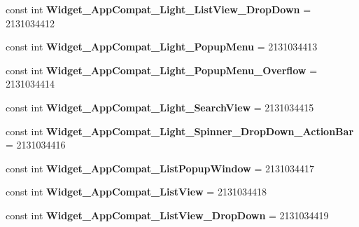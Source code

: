 \begin{DoxyCompactItemize}
\item 
\hypertarget{classClient_1_1Droid_1_1Resource_1_1Style_aad66653d42e13d2c43a6bc4760e02364}{}const int {\bfseries Widget\+\_\+\+App\+Compat\+\_\+\+Light\+\_\+\+List\+View\+\_\+\+Drop\+Down} = 2131034412\label{classClient_1_1Droid_1_1Resource_1_1Style_aad66653d42e13d2c43a6bc4760e02364}

\item 
\hypertarget{classClient_1_1Droid_1_1Resource_1_1Style_a28ac5fc9ff87ff1571a82f9e761ebbe6}{}const int {\bfseries Widget\+\_\+\+App\+Compat\+\_\+\+Light\+\_\+\+Popup\+Menu} = 2131034413\label{classClient_1_1Droid_1_1Resource_1_1Style_a28ac5fc9ff87ff1571a82f9e761ebbe6}

\item 
\hypertarget{classClient_1_1Droid_1_1Resource_1_1Style_aba5df96d4c744819b94126b9633366e2}{}const int {\bfseries Widget\+\_\+\+App\+Compat\+\_\+\+Light\+\_\+\+Popup\+Menu\+\_\+\+Overflow} = 2131034414\label{classClient_1_1Droid_1_1Resource_1_1Style_aba5df96d4c744819b94126b9633366e2}

\item 
\hypertarget{classClient_1_1Droid_1_1Resource_1_1Style_a699826296d25799257a6ba55d907957a}{}const int {\bfseries Widget\+\_\+\+App\+Compat\+\_\+\+Light\+\_\+\+Search\+View} = 2131034415\label{classClient_1_1Droid_1_1Resource_1_1Style_a699826296d25799257a6ba55d907957a}

\item 
\hypertarget{classClient_1_1Droid_1_1Resource_1_1Style_adff01f504a183925dcdf3d3f79bfe547}{}const int {\bfseries Widget\+\_\+\+App\+Compat\+\_\+\+Light\+\_\+\+Spinner\+\_\+\+Drop\+Down\+\_\+\+Action\+Bar} = 2131034416\label{classClient_1_1Droid_1_1Resource_1_1Style_adff01f504a183925dcdf3d3f79bfe547}

\item 
\hypertarget{classClient_1_1Droid_1_1Resource_1_1Style_ac1bb324a56a83daf8327afd202bd06e7}{}const int {\bfseries Widget\+\_\+\+App\+Compat\+\_\+\+List\+Popup\+Window} = 2131034417\label{classClient_1_1Droid_1_1Resource_1_1Style_ac1bb324a56a83daf8327afd202bd06e7}

\item 
\hypertarget{classClient_1_1Droid_1_1Resource_1_1Style_a685ec57bb72b15b9b4464d73bf9b9d81}{}const int {\bfseries Widget\+\_\+\+App\+Compat\+\_\+\+List\+View} = 2131034418\label{classClient_1_1Droid_1_1Resource_1_1Style_a685ec57bb72b15b9b4464d73bf9b9d81}

\item 
\hypertarget{classClient_1_1Droid_1_1Resource_1_1Style_aa773bedd099708e5a6d1055f2d7fd77d}{}const int {\bfseries Widget\+\_\+\+App\+Compat\+\_\+\+List\+View\+\_\+\+Drop\+Down} = 2131034419\label{classClient_1_1Droid_1_1Resource_1_1Style_aa773bedd099708e5a6d1055f2d7fd77d}


\end{DoxyCompactItemize}
